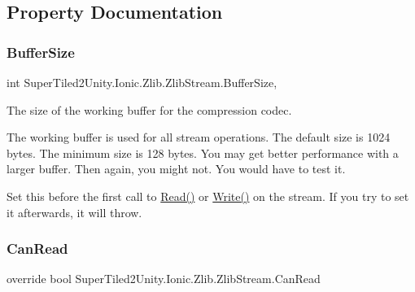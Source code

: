 \subsection{Property Documentation}
\mbox{\label{class_super_tiled2_unity_1_1_ionic_1_1_zlib_1_1_zlib_stream_a581e057f7fb9012f56cbc3fd7ab8b226}} 
\subsubsection{\texorpdfstring{Buffer\+Size}{BufferSize}}
{\footnotesize\ttfamily int Super\+Tiled2\+Unity.\+Ionic.\+Zlib.\+Zlib\+Stream.\+Buffer\+Size\hspace{0.3cm}{\ttfamily [get]}, {\ttfamily [set]}}



The size of the working buffer for the compression codec. 

The working buffer is used for all stream operations. The default size is 1024 bytes. The minimum size is 128 bytes. You may get better performance with a larger buffer. Then again, you might not. You would have to test it. 

Set this before the first call to {\ttfamily \mbox{\hyperlink{class_super_tiled2_unity_1_1_ionic_1_1_zlib_1_1_zlib_stream_a0987720c2d2c6219e1f1cbd9ae8ee818}{Read()}}} or {\ttfamily \mbox{\hyperlink{class_super_tiled2_unity_1_1_ionic_1_1_zlib_1_1_zlib_stream_a042abef8f9aa0d0043e6081d9de7dea7}{Write()}}} on the stream. If you try to set it afterwards, it will throw. \mbox{\label{class_super_tiled2_unity_1_1_ionic_1_1_zlib_1_1_zlib_stream_a6f6d2c1aa75d86e886417b6e2b7266a2}} 
\subsubsection{\texorpdfstring{Can\+Read}{CanRead}}
{\footnotesize\ttfamily override bool Super\+Tiled2\+Unity.\+Ionic.\+Zlib.\+Zlib\+Stream.\+Can\+Read\hspace{0.3cm}{\ttfamily [get]}}



